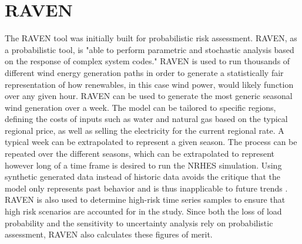 \documentclass[12pt]{UIdahoMastersThesis}
\begin{document}
\section{RAVEN}
The RAVEN tool was initially built for probabilistic risk assessment. RAVEN, as a probabilistic tool, is "able to perform parametric and stochastic analysis based on the response of complex system codes\cite{RabitiRAVEN}." RAVEN is used to run thousands of different wind energy generation paths in order to generate a statistically fair representation of how renewables, in this case wind power, would likely function over any given hour. RAVEN can be used to generate the most generic seasonal wind generation over a week. The model can be tailored to specific regions, defining the costs of inputs such as water and natural gas based on the typical regional price, as well as selling the electricity for the current regional rate. A typical week can be extrapolated to represent a given season. The process can be repeated over the different seasons, which can be extrapolated to represent however long of a time frame is desired to run the NRHES simulation. Using synthetic generated data instead of historic data avoids the critique that the model only represents past behavior and is thus inapplicable to future trends \cite{redfoot_epiney_2016}. RAVEN is also used to determine high-risk time series samples to ensure that high risk scenarios are accounted for in the study. Since both the loss of load probability and the sensitivity to uncertainty analysis rely on probabilistic assessment, RAVEN also calculates these figures of merit. 
\end{document}
